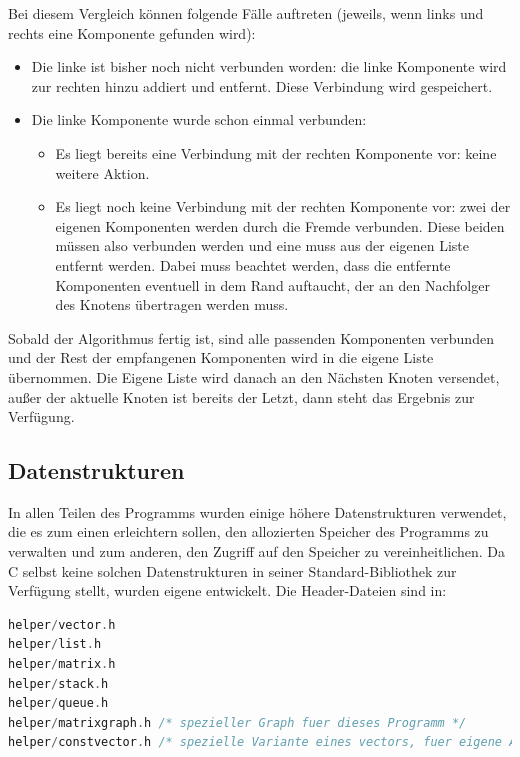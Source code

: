 Bei diesem Vergleich können folgende Fälle auftreten (jeweils, wenn links und rechts eine Komponente gefunden wird):
\begin{itemize}
	\item Die linke ist bisher noch nicht verbunden worden: die linke Komponente wird zur rechten hinzu addiert und entfernt. Diese Verbindung wird gespeichert.
	\item Die linke Komponente wurde schon einmal verbunden:
		\begin{itemize}
			\item Es liegt bereits eine Verbindung mit der rechten Komponente vor: keine weitere Aktion.
			\item Es liegt noch keine Verbindung mit der rechten Komponente vor: zwei der eigenen Komponenten werden durch die Fremde verbunden. Diese beiden müssen also verbunden werden und eine muss aus der eigenen Liste entfernt werden. Dabei muss beachtet werden, dass die entfernte Komponenten eventuell in dem Rand auftaucht, der an den Nachfolger des Knotens übertragen werden muss.
		\end{itemize}
\end{itemize}

Sobald der Algorithmus fertig ist, sind alle passenden Komponenten verbunden und der Rest der empfangenen Komponenten wird in die eigene Liste übernommen. Die Eigene Liste wird danach an den Nächsten Knoten versendet, außer der aktuelle Knoten ist bereits der Letzt, dann steht das Ergebnis zur Verfügung.

\subsection{Datenstrukturen} \label{algorithm:ds}

In allen Teilen des Programms wurden einige höhere Datenstrukturen verwendet, die es zum einen erleichtern sollen, den allozierten Speicher des Programms zu verwalten und zum anderen, den Zugriff auf den Speicher zu vereinheitlichen. Da C selbst keine solchen Datenstrukturen in seiner Standard-Bibliothek zur Verfügung stellt, wurden eigene entwickelt. Die Header-Dateien sind in:

\begin{lstlisting}[language=C, aboveskip=\baselineskip, basicstyle=\footnotesize\ttfamily, lineskip=0pt]
helper/vector.h
helper/list.h
helper/matrix.h
helper/stack.h
helper/queue.h
helper/matrixgraph.h /* spezieller Graph fuer dieses Programm */
helper/constvector.h /* spezielle Variante eines vectors, fuer eigene Allokatoren gedacht */
\end{lstlisting}

